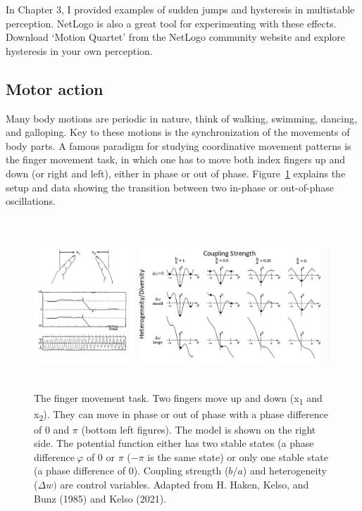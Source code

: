 \documentclass[
  letterpaper,
]{scrbook}
\begin{document}
In Chapter 3, I provided examples of sudden jumps and hysteresis in
multistable perception. NetLogo is also a great tool for experimenting
with these effects. Download `Motion Quartet' from the NetLogo community
website and explore hysteresis in your own perception.

\hypertarget{motor-action}{%
\subsection{Motor action}\label{motor-action}}

Many body motions are periodic in nature, think of walking, swimming,
dancing, and galloping. Key to these motions is the synchronization of
the movements of body parts. A famous paradigm for studying coordinative
movement patterns is the finger movement task, in which one has to move
both index fingers up and down (or right and left), either in phase or
out of phase. Figure~\ref{fig-ch4-img7} explains the setup and data
showing the transition between two in-phase or out-of-phase
oscillations.

\begin{figure}

{\centering \includegraphics[width=6.26389in,height=2.52153in]{media/ch4/image7.jpg}

}

\caption{\label{fig-ch4-img7}The finger movement task. Two fingers move
up and down (x\textsubscript{1} and x\textsubscript{2}). They can move
in phase or out of phase with a phase difference of 0 and \(\pi\)
(bottom left figures). The model is shown on the right side. The
potential function either has two stable states (a phase
difference\(\ \varphi\) of 0 or \(\pi\) (\(- \pi\) is the same state) or
only one stable state (a phase difference of 0). Coupling strength
(\(b/a\)) and heterogeneity (\(\Delta w)\) are control variables.
Adapted from H. Haken, Kelso, and Bunz (1985) and Kelso (2021).}

\end{figure}
\end{document}
